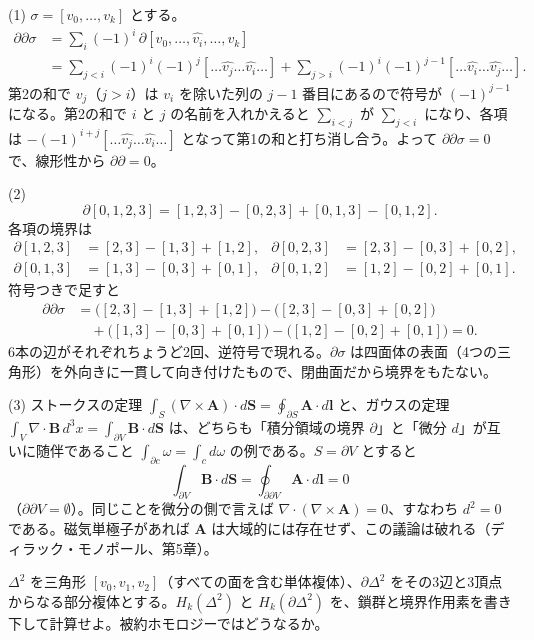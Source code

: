 \begin{solution}
(1) $\sigma=[v_0,\dots,v_k]$ とする。
\[
\begin{aligned}
\partial\partial\sigma&=\sum_{i}(-1)^i\,\partial[v_0,\dots,\widehat{v_i},\dots,v_k]\\
&=\sum_{j<i}(-1)^i(-1)^j[\dots\widehat{v_j}\dots\widehat{v_i}\dots]+\sum_{j>i}(-1)^i(-1)^{j-1}[\dots\widehat{v_i}\dots\widehat{v_j}\dots].
\end{aligned}
\]
第2の和で $v_j$（$j>i$）は $v_i$ を除いた列の $j-1$ 番目にあるので符号が $(-1)^{j-1}$ になる。第2の和で $i$ と $j$ の名前を入れかえると $\sum_{i<j}$ が $\sum_{j<i}$ になり、各項は $-(-1)^{i+j}[\dots\widehat{v_j}\dots\widehat{v_i}\dots]$ となって第1の和と打ち消し合う。よって $\partial\partial\sigma=0$ で、線形性から $\partial\partial=0$。

(2)
\[
\partial[0,1,2,3]=[1,2,3]-[0,2,3]+[0,1,3]-[0,1,2].
\]
各項の境界は
\begin{align*}
\partial[1,2,3]&=[2,3]-[1,3]+[1,2],&\partial[0,2,3]&=[2,3]-[0,3]+[0,2],\\
\partial[0,1,3]&=[1,3]-[0,3]+[0,1],&\partial[0,1,2]&=[1,2]-[0,2]+[0,1].
\end{align*}
符号つきで足すと
\[
\begin{aligned}
\partial\partial\sigma&=\bigl([2,3]-[1,3]+[1,2]\bigr)-\bigl([2,3]-[0,3]+[0,2]\bigr)\\
&\quad+\bigl([1,3]-[0,3]+[0,1]\bigr)-\bigl([1,2]-[0,2]+[0,1]\bigr)=0 .
\end{aligned}
\]
6本の辺がそれぞれちょうど2回、逆符号で現れる。$\partial\sigma$ は四面体の表面（4つの三角形）を外向きに一貫して向き付けたもので、閉曲面だから境界をもたない。

(3) ストークスの定理 $\int_S(\nabla\times\bm A)\cdot d\bm S=\oint_{\partial S}\bm A\cdot d\bm l$ と、ガウスの定理 $\int_V\nabla\cdot\bm B\,d^3x=\int_{\partial V}\bm B\cdot d\bm S$ は、どちらも「積分領域の境界 $\partial$」と「微分 $d$」が互いに随伴であること $\int_{\partial c}\omega=\int_c d\omega$ の例である。$S=\partial V$ とすると
\[
\int_{\partial V}\bm B\cdot d\bm S=\oint_{\partial\partial V}\bm A\cdot d\bm l=0
\]
（$\partial\partial V=\emptyset$）。同じことを微分の側で言えば $\nabla\cdot(\nabla\times\bm A)=0$、すなわち $d^2=0$ である。磁気単極子があれば $\bm A$ は大域的には存在せず、この議論は破れる（ディラック・モノポール、第5章）。
\end{solution}

\begin{problem}[難易度 A]\label{ch04-prob-simplex}
$\Delta^2$ を三角形 $[v_0,v_1,v_2]$（すべての面を含む単体複体）、$\partial\Delta^2$ をその3辺と3頂点からなる部分複体とする。$H_k(\Delta^2)$ と $H_k(\partial\Delta^2)$ を、鎖群と境界作用素を書き下して計算せよ。被約ホモロジーではどうなるか。
\end{problem}

